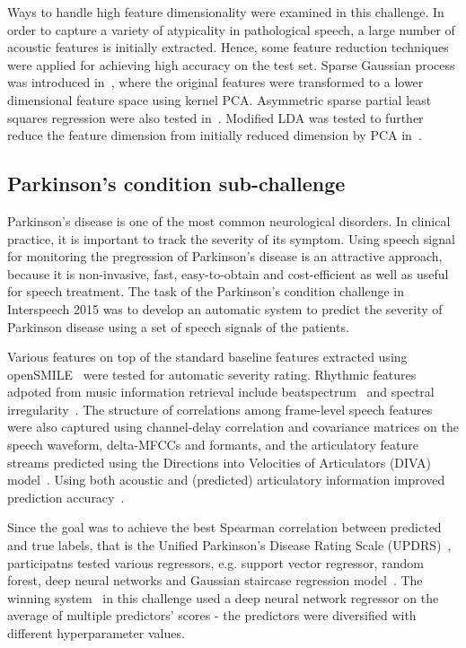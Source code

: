 \documentclass{article}
\begin{document}
Ways to handle high feature dimensionality were examined in this challenge.
In order to capture a variety of atypicality in pathological speech, a large number of acoustic features is initially extracted.
Hence, some feature reduction techniques were applied for achieving high accuracy on the test set.
Sparse Gaussian process was introduced in~\cite{lu2012predicting}, where the original features were transformed to a lower dimensional feature space using kernel PCA.
Asymmetric sparse partial least squares regression were also tested in~\cite{huang2012detecting}.
Modified LDA was tested to further reduce the feature dimension from initially reduced dimension by PCA in~\cite{zhou2012automatic}.

\subsection{Parkinson's condition sub-challenge}
Parkinson's disease is one of the most common neurological disorders.
In clinical practice, it is important to track the severity of its symptom.
Using speech signal for monitoring the pregression of Parkinson's disease is an attractive approach, because it is non-invasive, fast, easy-to-obtain and cost-efficient as well as useful for speech treatment.
The task of the Parkinson's condition challenge in Interspeech 2015 was to develop an automatic system to predict the severity of Parkinson disease using a set of speech signals of the patients.

Various features on top of the standard baseline features extracted using openSMILE~\cite{eyben2010themunich} were tested for automatic severity rating.
Rhythmic features adpoted from music information retrieval include beatspectrum~\cite{foote2002audio} and spectral irregularity~\cite{jensen1999timbre}.
The structure of correlations among frame-level speech features were also captured using channel-delay correlation and covariance matrices on the speech waveform, delta-MFCCs and formants, and the articulatory feature streams predicted using the Directions into Velocities of Articulators (DIVA) model~\cite{guenther2006neural,williamson2015segment}.
Using both acoustic and (predicted) articulatory information improved prediction accuracy~\cite{hahm2015parkinson}.

Since the goal was to achieve the best Spearman correlation between predicted and true labels, that is the Unified Parkinson's Disease Rating Scale (UPDRS)~\cite{stebbins1998factor}, participatns tested various regressors, e.g. support vector regressor, random forest, deep neural networks and Gaussian staircase regression model~\cite{williamson2013vocal}. The winning system~\cite{grosz2015assessing} in this challenge used a deep neural network regressor on the average of multiple predictors' scores - the predictors were diversified with different hyperparameter values. 
\end{document}
